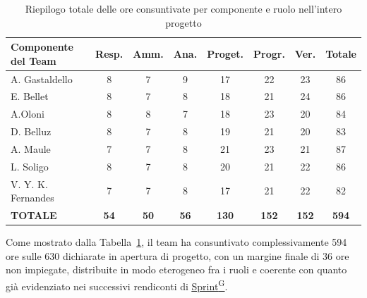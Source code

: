 \documentclass[a4paper,12pt]{article}
\providecommand{\glslink}[2]{\href{https://alittlebyte-19.github.io/Documentazione/glossario.html\#gls-#1}{\underline{#2}\textsuperscript{\scriptsize G}}}
\begin{document}
\begin{table}[H]
\centering
\renewcommand{\arraystretch}{1.5}
\begin{tabularx}{\textwidth}{|X|c|c|c|c|c|c|c|}
\hline
\textbf{Componente del Team} & \textbf{Resp.} & \textbf{Amm.} & \textbf{Ana.} & \textbf{Proget.} & \textbf{Progr.} & \textbf{Ver.} & \textbf{Totale} \\
\hline
A. Gastaldello & 8 & 7 & 9 & 17 & 22 & 23 & 86 \\
\hline
E. Bellet & 8 & 7 & 8 & 18 & 21 & 24 & 86 \\
\hline
A.Oloni & 8 & 8 & 7 & 18 & 23 & 20 & 84 \\
\hline
D. Belluz & 8 & 7 & 8 & 19 & 21 & 20 & 83 \\
\hline
A. Maule & 7 & 7 & 8 & 21 & 23 & 21 & 87 \\
\hline
L. Soligo & 8 & 7 & 8 & 20 & 21 & 22 & 86 \\
\hline
V. Y. K. Fernandes & 7 & 7 & 8 & 17 & 21 & 22 & 82 \\
\hline
\rowcolor{gray!20}
\textbf{TOTALE} & \textbf{54} & \textbf{50} & \textbf{56} & \textbf{130} & \textbf{152} & \textbf{152} & \textbf{594} \\
\hline
\end{tabularx}
\caption{Riepilogo totale delle ore consuntivate per componente e ruolo nell'intero progetto}
\label{tab:riepilogo_ore_finale}
\end{table}

Come mostrato dalla Tabella~\ref{tab:riepilogo_ore_finale}, il team ha consuntivato complessivamente 594 ore sulle 630 dichiarate in apertura di progetto, con un margine finale di 36 ore non impiegate, distribuite in modo eterogeneo fra i ruoli e coerente con quanto già evidenziato nei successivi rendiconti di \glslink{sprint}{Sprint}.
\end{document}
